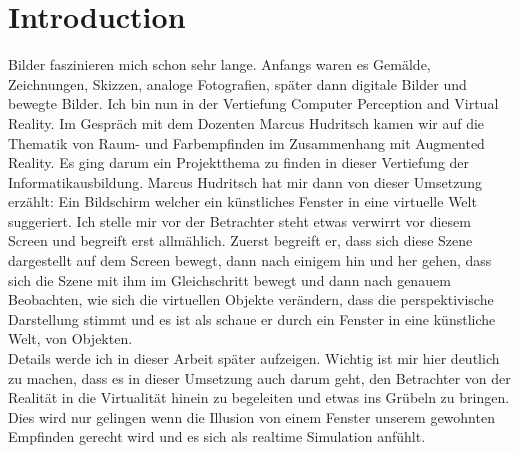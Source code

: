 \section{Introduction}

Bilder faszinieren mich schon sehr lange. Anfangs waren es Gemälde, Zeichnungen, Skizzen, analoge Fotografien, später dann digitale Bilder und bewegte Bilder. 
Ich bin nun in der Vertiefung Computer Perception and Virtual Reality. Im Gespr\"ach mit dem Dozenten Marcus Hudritsch kamen wir auf die Thematik von Raum- und Farbempfinden im Zusammenhang mit Augmented Reality. Es ging darum ein Projektthema zu finden in dieser Vertiefung der Informatikausbildung.
Marcus Hudritsch hat mir dann von dieser Umsetzung erzählt: Ein Bildschirm welcher ein künstliches Fenster in eine virtuelle Welt suggeriert.
Ich stelle mir vor der Betrachter steht etwas verwirrt vor diesem Screen und begreift erst allm\"ahlich. Zuerst begreift er, dass sich diese Szene dargestellt auf dem Screen bewegt, dann nach einigem hin und her gehen, dass sich die Szene mit ihm im Gleichschritt bewegt und dann nach genauem Beobachten, wie sich die virtuellen Objekte verändern, dass die perspektivische Darstellung stimmt und es ist als schaue er durch ein Fenster in eine künstliche Welt, von Objekten. \\ Details werde ich in dieser Arbeit später aufzeigen. Wichtig ist mir hier deutlich zu machen, dass es in dieser Umsetzung auch darum geht, den Betrachter von der Realität in die Virtualität hinein zu begeleiten und etwas ins Grübeln zu bringen. \\ Dies wird nur gelingen wenn die Illusion von einem Fenster unserem gewohnten Empfinden gerecht wird und es sich als realtime Simulation anfühlt.
